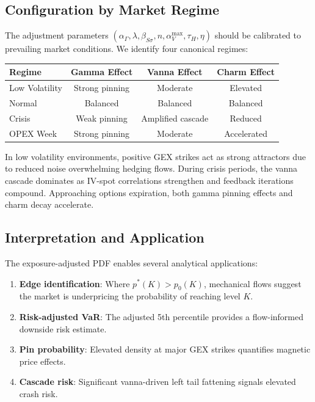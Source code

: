 \documentclass[11pt, a4paper]{article}
\begin{document}
\subsection{Configuration by Market Regime}

The adjustment parameters $(\alpha_\Gamma, \lambda, \beta_{S\sigma}, n, \alpha_V^{\max}, \tau_H, \eta)$ should be calibrated to prevailing market conditions. We identify four canonical regimes:

\begin{center}
\begin{tabular}{l|ccc}
\textbf{Regime} & \textbf{Gamma Effect} & \textbf{Vanna Effect} & \textbf{Charm Effect} \\
\hline
Low Volatility & Strong pinning & Moderate & Elevated \\
Normal & Balanced & Balanced & Balanced \\
Crisis & Weak pinning & Amplified cascade & Reduced \\
OPEX Week & Strong pinning & Moderate & Accelerated \\
\end{tabular}
\end{center}

In low volatility environments, positive GEX strikes act as strong attractors due to reduced noise overwhelming hedging flows. During crisis periods, the vanna cascade dominates as IV-spot correlations strengthen and feedback iterations compound. Approaching options expiration, both gamma pinning effects and charm decay accelerate.

\subsection{Interpretation and Application}

The exposure-adjusted PDF enables several analytical applications:

\begin{enumerate}
    \item \textbf{Edge identification}: Where $p^*(K) > p_0(K)$, mechanical flows suggest the market is underpricing the probability of reaching level $K$.
    \item \textbf{Risk-adjusted VaR}: The adjusted 5th percentile provides a flow-informed downside risk estimate.
    \item \textbf{Pin probability}: Elevated density at major GEX strikes quantifies magnetic price effects.
    \item \textbf{Cascade risk}: Significant vanna-driven left tail fattening signals elevated crash risk.
\end{enumerate}
\end{document}
